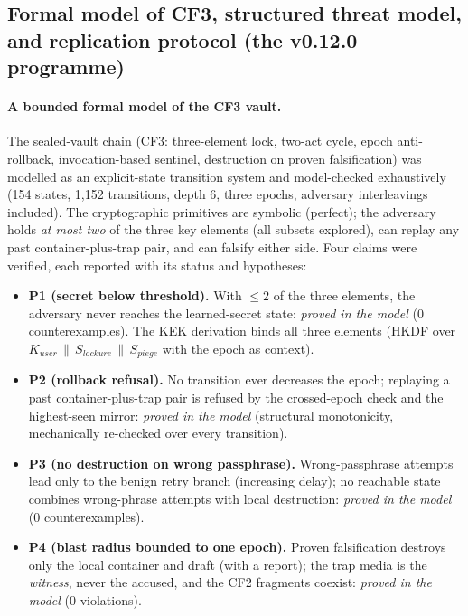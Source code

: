 \documentclass[11pt,a4paper]{article}
\begin{document}
\subsection{Formal model of CF3, structured threat model, and
replication protocol (the v0.12.0 programme)}\label{sec:formel}

\paragraph{A bounded formal model of the CF3 vault.} The sealed-vault
chain (CF3: three-element lock, two-act cycle, epoch anti-rollback,
invocation-based sentinel, destruction on proven falsification) was
modelled as an explicit-state transition system and model-checked
exhaustively (154 states, 1{,}152 transitions, depth 6, three epochs,
adversary interleavings included). The cryptographic primitives are
symbolic (perfect); the adversary holds \emph{at most two} of the three
key elements (all subsets explored), can replay any past
container-plus-trap pair, and can falsify either side. Four claims were
verified, each reported with its status and hypotheses:

\begin{itemize}
\item \textbf{P1 (secret below threshold).} With $\le 2$ of the three
elements, the adversary never reaches the learned-secret state:
\emph{proved in the model} (0 counterexamples). The KEK derivation
binds all three elements (HKDF over $K_{user}\,\|\,S_{lockure}\,\|\,
S_{piege}$ with the epoch as context).
\item \textbf{P2 (rollback refusal).} No transition ever decreases the
epoch; replaying a past container-plus-trap pair is refused by the
crossed-epoch check and the highest-seen mirror: \emph{proved in the
model} (structural monotonicity, mechanically re-checked over every
transition).
\item \textbf{P3 (no destruction on wrong passphrase).} Wrong-passphrase
attempts lead only to the benign retry branch (increasing delay); no
reachable state combines wrong-phrase attempts with local destruction:
\emph{proved in the model} (0 counterexamples).
\item \textbf{P4 (blast radius bounded to one epoch).} Proven
falsification destroys only the local container and draft (with a
report); the trap media is the \emph{witness}, never the accused, and
the CF2 fragments coexist: \emph{proved in the model} (0 violations).
\end{itemize}
\end{document}
